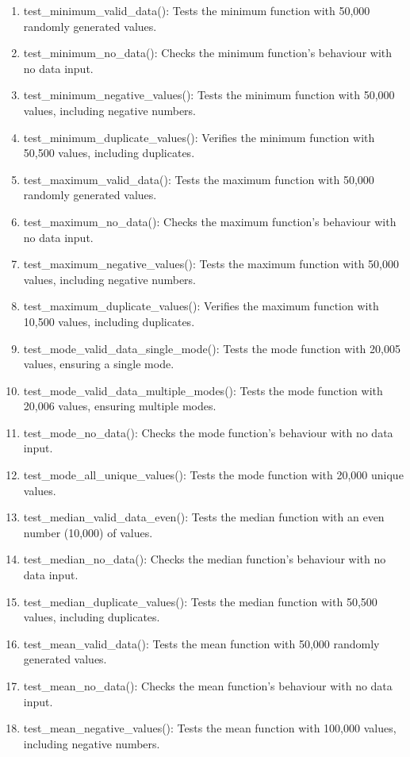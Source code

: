 \documentclass[english,12pt,a4paper]{report}
\begin{document}
	\begin{enumerate}
		\item test\_minimum\_valid\_data():  Tests the minimum function with 50,000 randomly generated values.
		\item test\_minimum\_no\_data():  Checks the minimum function's behaviour with no data input.
		\item test\_minimum\_negative\_values():  Tests the minimum function with 50,000 values, including negative numbers.
		\item test\_minimum\_duplicate\_values():  Verifies the minimum function with 50,500 values, including duplicates.
		\item test\_maximum\_valid\_data():  Tests the maximum function with 50,000 randomly generated values.
		\item test\_maximum\_no\_data():  Checks the maximum function's behaviour with no data input.
		\item test\_maximum\_negative\_values():  Tests the maximum function with 50,000 values, including negative numbers.
		\item test\_maximum\_duplicate\_values():  Verifies the maximum function with 10,500 values, including duplicates.
		\item test\_mode\_valid\_data\_single\_mode():  Tests the mode function with 20,005 values, ensuring a single mode.
		\item test\_mode\_valid\_data\_multiple\_modes():  Tests the mode function with 20,006 values, ensuring multiple modes.
		\item test\_mode\_no\_data():  Checks the mode function's behaviour with no data input.
		\item test\_mode\_all\_unique\_values():  Tests the mode function with 20,000 unique values.
		\item test\_median\_valid\_data\_even():  Tests the median function with an even number (10,000) of values.
		\item test\_median\_no\_data():  Checks the median function's behaviour with no data input.
		\item test\_median\_duplicate\_values():  Tests the median function with 50,500 values, including duplicates.
		\item test\_mean\_valid\_data():  Tests the mean function with 50,000 randomly generated values.
		\item test\_mean\_no\_data():  Checks the mean function's behaviour with no data input.
		\item test\_mean\_negative\_values():  Tests the mean function with 100,000 values, including negative numbers.

\end{enumerate}
\end{document}

